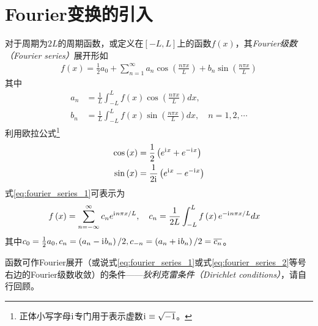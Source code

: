 \documentclass[main.tex]{subfiles}
\begin{document}
\section{Fourier变换的引入}
对于周期为$2L$的周期函数，或定义在$\left[-L,L\right]$上的函数$f\left(x\right)$，其\emph{Fourier级数（Fourier series）}展开\cite[\S 11.5, \S 11.6]{华工高数2009下}形如
\begin{align}\label{eq:fourier_series_1}
    f\left(x\right)=\frac{1}{2}a_0+\sum_{n=1}^\infty a_n\cos\left(\frac{n\pi x}{L}\right)+b_n\sin\left(\frac{n\pi x}{L}\right)
\end{align}
其中
\begin{align*}
    a_n & =\frac{1}{L}\int_{-L}^L f\left(x\right)\cos\left(\frac{n\pi x}{L}\right)dx,                   \\
    b_n & =\frac{1}{L}\int_{-L}^L f\left(x\right)\sin\left(\frac{n\pi x}{L}\right)dx,\quad n=1,2,\cdots
\end{align*}
利用欧拉公式\footnote{正体小写字母$\mathrm{i}\mkern1mu$专门用于表示虚数$\mathrm{i}\mkern1mu\equiv\sqrt{-1}$。}
\begin{align*}
    \cos\left(x\right) & =\frac{1}{2}\left(e^{\mathrm{i}\mkern1mu x}+e^{-\mathrm{i}\mkern1mu x}\right)       \\
    \sin\left(x\right) & =\frac{1}{2\mathrm{i}\mkern1mu}\left(e^{\mathrm{i}\mkern1mu x}-e^{-\mathrm{i}\mkern1mu x}\right)
\end{align*}
式\eqref{eq:fourier_series_1}可表示为
\begin{align}\label{eq:fourier_series_2}
    f\left(x\right) & =\sum_{n=-\infty}^{\infty}c_ne^{\mathrm{i}\mkern1mu n\pi x/L},\quad c_n=\frac{1}{2L}\int_{-L}^Lf\left(x\right)e^{-\mathrm{i}\mkern1mu n\pi x/L}dx
\end{align}
其中$c_0=\frac{1}{2}a_0,c_n=\left(a_n-\mathrm{i}\mkern1mu b_n\right)/2,c_{-n}=\left(a_n+\mathrm{i}\mkern1mu b_n\right)/2=\overline{c_n}$。

函数可作Fourier展开（或说式\eqref{eq:fourier_series_1}或式\eqref{eq:fourier_series_2}等号右边的Fourier级数收敛）的条件——\emph{狄利克雷条件（Dirichlet conditions）}，请自行回顾\cite[定理11.6.1，p.301]{华工高数2009下}。
\end{document}
